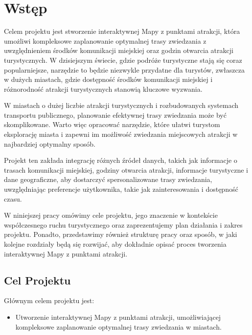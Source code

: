 \documentclass{report}
\begin{document}
	
	
	\clearpage
		\chapter{Wstęp}
	
	Celem projektu jest stworzenie interaktywnej Mapy z punktami atrakcji, która umożliwi kompleksowe zaplanowanie optymalnej trasy zwiedzania z uwzględnieniem środków komunikacji miejskiej oraz godzin otwarcia atrakcji turystycznych. W dzisiejszym świecie, gdzie podróże turystyczne stają się coraz popularniejsze, narzędzie to będzie niezwykle przydatne dla turystów, zwłaszcza w dużych miastach, gdzie dostępność środków komunikacji miejskiej i różnorodność atrakcji turystycznych stanowią kluczowe wyzwania.
	
	W miastach o dużej liczbie atrakcji turystycznych i rozbudowanych systemach transportu publicznego, planowanie efektywnej trasy zwiedzania może być skomplikowane. Warto więc opracować narzędzie, które ułatwi turystom eksplorację miasta i zapewni im możliwość zwiedzania miejscowych atrakcji w najbardziej optymalny sposób.
	
	Projekt ten zakłada integrację różnych źródeł danych, takich jak informacje o trasach komunikacji miejskiej, godziny otwarcia atrakcji, informacje turystyczne i dane geograficzne, aby dostarczyć spersonalizowane trasy zwiedzania, uwzględniając preferencje użytkownika, takie jak zainteresowania i dostępność czasu.
	
	W niniejszej pracy omówimy cele projektu, jego znaczenie w kontekście współczesnego ruchu turystycznego oraz zaprezentujemy plan działania i zakres projektu. Ponadto, przedstawimy również strukturę pracy oraz sposób, w jaki kolejne rozdziały będą się rozwijać, aby dokładnie opisać proces tworzenia interaktywnej Mapy z punktami atrakcji.
	
	\section{Cel Projektu}
	
	Głównym celem projektu jest:
	
	\begin{itemize}
		\item Utworzenie interaktywnej Mapy z punktami atrakcji, umożliwiającej kompleksowe zaplanowanie optymalnej trasy zwiedzania w miastach.
	\end{itemize}
	
\end{document}
